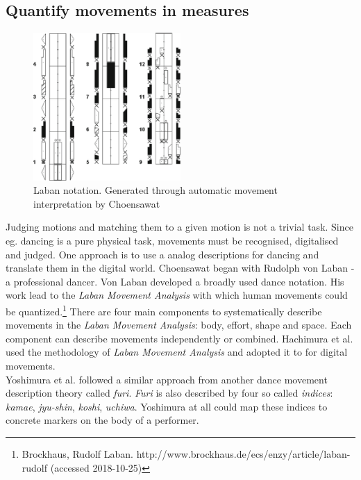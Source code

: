 
\subsection{Quantify movements \todo in measures} \label{quantifymovements}
\begin{figure}
	\centering
	\includegraphics[width=0.5\textwidth]{img/laban.png}
	\caption{Laban notation. Generated through automatic movement interpretation by Choensawat \cite{Choensawat2015}}
	\label{fig:laban}
\end{figure}
Judging motions and matching them to a given motion is not a trivial task. Since eg. dancing is a pure physical task, movements must be recognised, digitalised and judged. One approach is to use a analog descriptions for dancing and translate them in the digital world. Choensawat \cite{Choensawat2015} began with Rudolph von Laban - a professional dancer. Von Laban developed a broadly used dance notation. His work lead to the \textit{Laban Movement Analysis} with which human movements could be quantized.\footnote{Brockhaus, Rudolf Laban. http://www.brockhaus.de/ecs/enzy/article/laban-rudolf (accessed 2018-10-25)} There are four main components to systematically describe movements in the \textit{Laban Movement Analysis}: body, effort, shape and space. Each component can describe movements independently or combined. Hachimura et al. \cite{Hachimura2005} used the methodology  of \textit{Laban Movement Analysis} and adopted it to for digital movements.\\
Yoshimura et al. \cite{Yoshimura2005} followed a similar approach from another dance movement description theory called \textit{furi}. \textit{Furi} is also described by four so called \textit{indices}: \textit{kamae}, \textit{jyu-shin}, \textit{koshi}, \textit{uchiwa}. Yoshimura at all could map these indices to concrete markers on the body of a performer.
